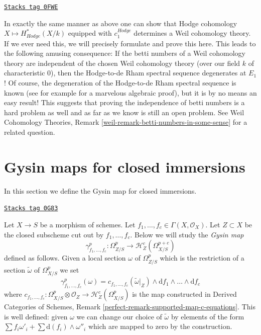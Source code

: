 \begin{remark}
\label{derham-remark-hodge-cohomology-is-weil}
\href{https://stacks.math.columbia.edu/tag/0FWE}{\texttt{Stacks tag 0FWE}}

In exactly the same manner as above one can show that
Hodge cohomology $X \mapsto H_{Hodge}^*(X/k)$ equipped
with $c_1^{Hodge}$ determines a Weil
cohomology theory. If we ever need this, we will precisely
formulate and prove this here. This leads to the following
amusing consequence: If the betti numbers of a Weil cohomology
theory are independent of the chosen Weil cohomology theory
(over our field $k$ of characteristic $0$), then
the Hodge-to-de Rham spectral sequence
degenerates at $E_1$! Of course, the degeneration of
the Hodge-to-de Rham spectral sequence is known
(see for example \cite{Deligne-Illusie} for a marvelous algebraic proof),
but it is by no means an easy result! This suggests that proving
the independence of betti numbers is a hard problem as well
and as far as we know is still an open problem. See
Weil Cohomology Theories, Remark
\ref{weil-remark-betti-numbers-in-some-sense} for a related question.
\end{remark}

\section{Gysin maps for closed immersions}
\label{derham-section-gysin}
In this section we define the Gysin map for closed immersions.

\begin{remark}
\label{derham-remark-gysin-equations}
\href{https://stacks.math.columbia.edu/tag/0G83}{\texttt{Stacks tag 0G83}}

Let $X \to S$ be a morphism of schemes. Let
$f_1, \ldots, f_c \in \Gamma(X, \mathcal{O}_X)$. Let $Z \subset X$
be the closed subscheme cut out by $f_1, \ldots, f_c$. Below we will
study the {\it Gysin map}
\begin{equation}
\label{equation-gysin}
\gamma^p_{f_1, \ldots, f_c} :
\Omega^p_{Z/S}
\longrightarrow
\mathcal{H}_Z^c(\Omega^{p + c}_{X/S})
\end{equation}
defined as follows. Given a local section $\omega$ of $\Omega^p_{Z/S}$
which is the restriction of a section $\tilde \omega$ of $\Omega^p_{X/S}$
we set
$$
\gamma^p_{f_1, \ldots, f_c}(\omega) =
c_{f_1, \ldots, f_c}(\tilde \omega|_Z) \wedge
\text{d}f_1 \wedge \ldots \wedge \text{d}f_c
$$
where $c_{f_1, \ldots, f_c} : \Omega^p_{X/S} \otimes \mathcal{O}_Z \to
\mathcal{H}_Z^c(\Omega^p_{X/S})$ is the map constructed in
Derived Categories of Schemes, Remark
\ref{perfect-remark-supported-map-c-equations}.
This is well defined: given $\omega$ we can change our choice of
$\tilde \omega$ by elements of the form
$\sum f_i \omega'_i + \sum \text{d}(f_i) \wedge \omega''_i$
which are mapped to zero by the construction.
\end{remark}

